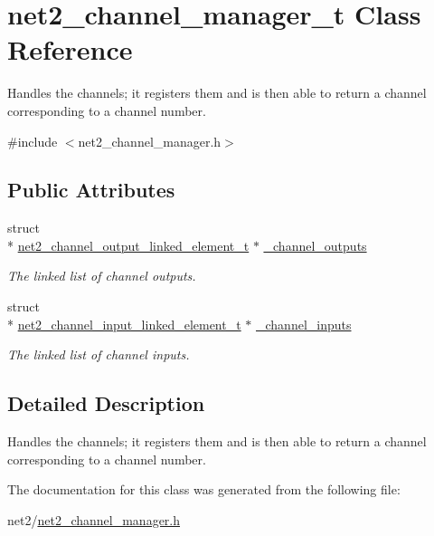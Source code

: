 \hypertarget{structnet2__channel__manager__t}{\section{net2\-\_\-channel\-\_\-manager\-\_\-t Class Reference}
\label{structnet2__channel__manager__t}
}


Handles the channels; it registers them and is then able to return a channel corresponding to a channel number.  




{\ttfamily \#include $<$net2\-\_\-channel\-\_\-manager.\-h$>$}

\subsection*{Public Attributes}
\begin{DoxyCompactItemize}
\item 
\hypertarget{structnet2__channel__manager__t_a994bf9242cb70c45711e2a670123a18e}{struct \\*
\hyperlink{structnet2__channel__output__linked__element__t}{net2\-\_\-channel\-\_\-output\-\_\-linked\-\_\-element\-\_\-t} $\ast$ \hyperlink{structnet2__channel__manager__t_a994bf9242cb70c45711e2a670123a18e}{\-\_\-channel\-\_\-outputs}}\label{structnet2__channel__manager__t_a994bf9242cb70c45711e2a670123a18e}

\begin{DoxyCompactList}\small\item\em The linked list of channel outputs. \end{DoxyCompactList}\item 
\hypertarget{structnet2__channel__manager__t_a3e16fdcf5489413c2fabc6c009545ae1}{struct \\*
\hyperlink{structnet2__channel__input__linked__element__t}{net2\-\_\-channel\-\_\-input\-\_\-linked\-\_\-element\-\_\-t} $\ast$ \hyperlink{structnet2__channel__manager__t_a3e16fdcf5489413c2fabc6c009545ae1}{\-\_\-channel\-\_\-inputs}}\label{structnet2__channel__manager__t_a3e16fdcf5489413c2fabc6c009545ae1}

\begin{DoxyCompactList}\small\item\em The linked list of channel inputs. \end{DoxyCompactList}\end{DoxyCompactItemize}


\subsection{Detailed Description}
Handles the channels; it registers them and is then able to return a channel corresponding to a channel number. 

The documentation for this class was generated from the following file\-:\begin{DoxyCompactItemize}
\item 
net2/\hyperlink{net2__channel__manager_8h}{net2\-\_\-channel\-\_\-manager.\-h}\end{DoxyCompactItemize}
